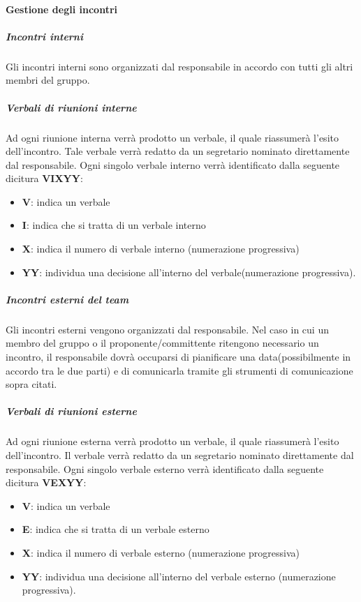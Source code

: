 			
			\paragraph{Gestione degli incontri}
			
				\subparagraph{Incontri interni}
				Gli incontri interni sono organizzati dal responsabile in accordo con tutti gli altri membri del gruppo. 
				
				\subparagraph{Verbali di riunioni interne}
				Ad ogni riunione interna verrà prodotto un verbale, il quale riassumerà l'esito dell'incontro. Tale verbale verrà redatto da un segretario nominato direttamente dal responsabile. Ogni singolo verbale interno verrà identificato dalla seguente dicitura \textbf{VIXYY}:
				\begin{itemize}
					\item \textbf{V}: indica un verbale
					\item\textbf{I}: indica che si tratta di un verbale interno
					\item\textbf{X}: indica il numero di verbale interno (numerazione progressiva)
					\item\textbf{YY}: individua una decisione all'interno del verbale(numerazione progressiva).
				\end{itemize}
			
				\subparagraph{Incontri esterni del team}
				Gli incontri esterni vengono organizzati dal responsabile. Nel caso in cui un membro del gruppo o il proponente/committente ritengono necessario un incontro, il responsabile dovrà occuparsi di pianificare una data(possibilmente in accordo tra le due parti) e di comunicarla tramite gli strumenti di comunicazione sopra citati.
				
				\subparagraph{Verbali di riunioni esterne}
				Ad ogni riunione esterna verrà prodotto un verbale, il quale riassumerà l'esito dell'incontro. Il verbale verrà redatto da un segretario nominato direttamente dal responsabile. Ogni singolo verbale esterno verrà identificato dalla seguente dicitura \textbf{VEXYY}:
				\begin{itemize}
					\item\textbf{V}: indica un verbale
					\item\textbf{E}: indica che si tratta di un verbale esterno
					\item\textbf{X}: indica il numero di verbale esterno (numerazione progressiva)
					\item\textbf{YY}: individua una decisione all'interno del verbale esterno (numerazione progressiva).
				\end{itemize}
			
